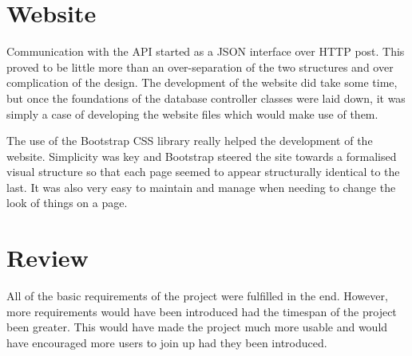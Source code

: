 \section{Website}
	Communication with the API started as a JSON interface over HTTP post. This proved to be little more than an over-separation of the two structures and over complication of the design. The development of the website did take some time, but once the foundations of the database controller classes were laid down, it was simply a case of developing the website files which would make use of them.
	
	The use of the Bootstrap CSS library really helped the development of the website. Simplicity was key and Bootstrap steered the site towards a formalised visual structure so that each page seemed to appear structurally identical to the last. It was also very easy to maintain and manage when needing to change the look of things on a page.

\section{Review}
	All of the basic requirements of the project were fulfilled in the end. However, more requirements would have been introduced had the timespan of the project been greater. This would have made the project much more usable and would have encouraged more users to join up had they been introduced.
